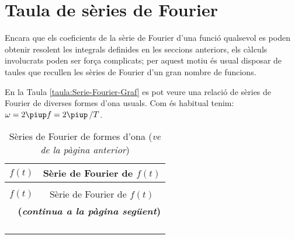 \section{Taula de sèries de Fourier}

Encara que els coeficients de la sèrie de Fourier d'una funció qualsevol es poden
obtenir resolent les integrals definides en les seccions anteriors, els càlculs
involucrats poden ser força complicats; per aquest motiu és usual
disposar de taules que recullen les sèries de Fourier d'un
gran nombre de funcions.

En la Taula \vref{taula:Serie-Fourier-Graf} es pot veure una relació de
sèries de Fourier de diverses formes d'ona usuals. Com és habitual tenim: $\omega=2\piup f = 2\piup\, / T$.

\begin{longtable}{cc}
   \caption{\label{taula:Serie-Fourier-Graf} Sèries de Fourier de formes d'ona}\\
   \toprule[1pt]
   $f(t)$ & Sèrie de Fourier de $f(t)$\\
   \midrule
   \endfirsthead
   \caption[]{Sèries de Fourier de formes d'ona (\emph{ve de la pàgina anterior})} \\
   \toprule[1pt]
   $f(t)$ & Sèrie de Fourier de $f(t)$\\
   \midrule
   \endhead
   \midrule
   \multicolumn{2}{r}{\sffamily\bfseries\color{NavyBlue}(\emph{continua a la pàgina següent})}
   \endfoot
   \endlastfoot
    & \raisebox{0.8cm}{$\displaystyle\frac{K}{2} + \frac{{2K}}{\piup }\sum\limits_{n = 1}^\infty  {\frac{{\sin \big((2n - 1)\omega t\big)}}{{2n - 1}}}$}\\[2.4ex]
    & \raisebox{1.2cm}{$\displaystyle\frac{{4K}}{\piup }\sum\limits_{n = 1}^\infty  {\frac{{\sin \big((2n - 1)\omega t\big)}}{{2n - 1}}}$}\\[2.4ex]
    & \raisebox{0.8cm}{$\displaystyle\frac{{K \tau }}{{T}} + \frac{{2K}}{\piup }\sum\limits_{n = 1}^\infty  {\frac{{( - 1)^n \sin \left(\dfrac{{n\omega \tau }}{2}\right)\cos (n\omega t)}}{n}}$} \\[2.4ex]
    & \raisebox{1.2cm}{$\displaystyle\frac{{2K}}{\piup }\sum\limits_{n = 1}^\infty  {\frac{{( - 1)^n (\cos (n\omega \tau )-1)\sin (n\omega t)}}{n}}$} \\[2.4ex]
    & \raisebox{1.2cm}{$\displaystyle\frac{{4K}}{{\piup }}\sum\limits_{n = 1}^\infty  {\frac{{ (-1)^{n+1}\sin \left(\dfrac{{(2n-1)\omega \tau }}{2}\right)\sin \big((2n-1)\omega t\big)}}{2n-1}}$} \\[2.4ex]

\end{longtable}
